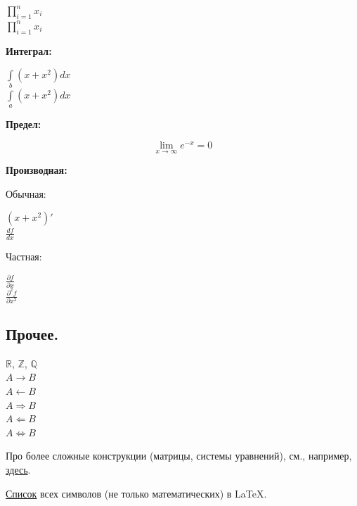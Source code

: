 \documentclass[12pt]{article}
\begin{document}
\begin{LTXexample}
$\prod_{i=1}^{n} x_i$ \\
$\prod\limits_{i=1}^{n} x_i$ 
\end{LTXexample}

\textbf{Интеграл:}

\begin{LTXexample}
$\int (x + x^2)dx$  \\
$\int\limits_{a}^{b} (x + x^2)dx$ 
\end{LTXexample}

\textbf{Предел:}

\begin{LTXexample}
$$\lim_{x \rightarrow \infty} e^{-x} = 0$$ 
\end{LTXexample}

\textbf{Производная:}

Обычная:

\begin{LTXexample}
$(x+x^2)'$ \\
$\frac{df}{dx}$
\end{LTXexample}

Частная:

\begin{LTXexample}
$\frac{\partial f}{\partial x}$ \\
$\frac{\partial^2 f}{\partial x^2}$
\end{LTXexample}

\subsection{Прочее.}

\begin{LTXexample}
$\mathbb{R}$,  $\mathbb{Z}$, $\mathbb{Q}$ \\
$A \rightarrow B$ \\
$A \leftarrow B$ \\
$A \Rightarrow B$ \\
$A \Leftarrow B$ \\
$A \Leftrightarrow B$
\end{LTXexample}

Про более сложные конструкции (матрицы, системы уравнений), см., например, \href{https://en.wikibooks.org/wiki/LaTeX/Mathematics}{здесь}. 

\href{http://tug.ctan.org/info/symbols/comprehensive/symbols-a4.pdf}{Список} всех символов (не только математических) в \LaTeX{}. 
\end{document}
